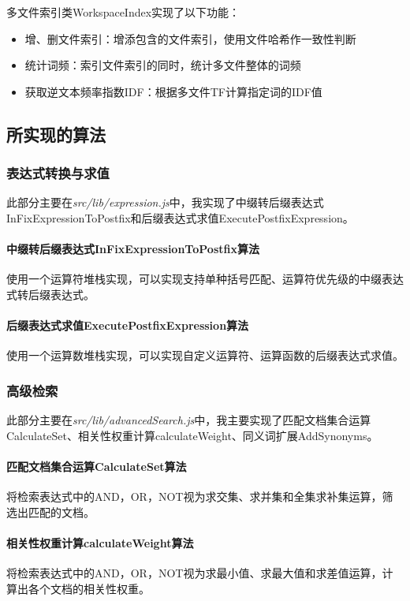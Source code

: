 \documentclass[scheme = chinese]{ctexart}
\begin{document}
多文件索引类WorkspaceIndex实现了以下功能：
\begin{itemize}
    \item 增、删文件索引：增添包含的文件索引，使用文件哈希作一致性判断
    \item 统计词频：索引文件索引的同时，统计多文件整体的词频
    \item 获取逆文本频率指数IDF：根据多文件TF计算指定词的IDF值
\end{itemize}

\subsection{所实现的算法}

\subsubsection{表达式转换与求值}
此部分主要在\emph{src/lib/expression.js}中，我实现了中缀转后缀表达式InFixExpressionToPostfix和后缀表达式求值ExecutePostfixExpression。

\paragraph{中缀转后缀表达式InFixExpressionToPostfix算法} 使用一个运算符堆栈实现，可以实现支持单种括号匹配、运算符优先级的中缀表达式转后缀表达式。

\paragraph{后缀表达式求值ExecutePostfixExpression算法} 使用一个运算数堆栈实现，可以实现自定义运算符、运算函数的后缀表达式求值。

\subsubsection{高级检索}
此部分主要在\emph{src/lib/advancedSearch.js}中，我主要实现了匹配文档集合运算CalculateSet、相关性权重计算calculateWeight、同义词扩展AddSynonyms。

\paragraph{匹配文档集合运算CalculateSet算法} 将检索表达式中的AND，OR，NOT视为求交集、求并集和全集求补集运算，筛选出匹配的文档。

\paragraph{相关性权重计算calculateWeight算法} 将检索表达式中的AND，OR，NOT视为求最小值、求最大值和求差值运算，计算出各个文档的相关性权重。
\end{document}
